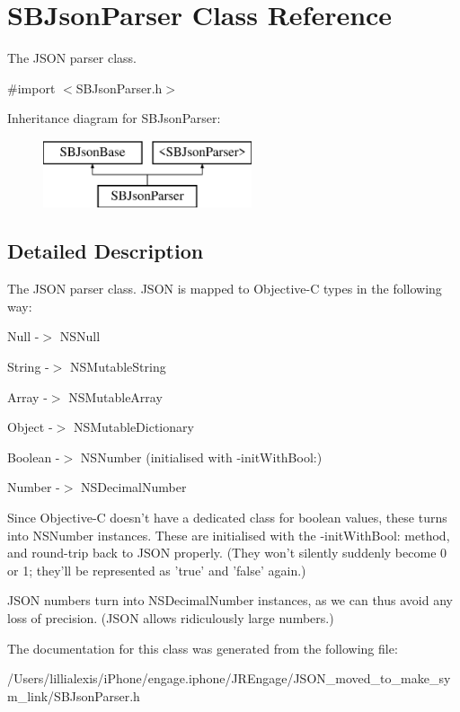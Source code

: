 \hypertarget{interface_s_b_json_parser}{
\section{SBJsonParser Class Reference}
\label{interface_s_b_json_parser}
}


The JSON parser class.  




{\ttfamily \#import $<$SBJsonParser.h$>$}

Inheritance diagram for SBJsonParser:\begin{figure}[H]
\begin{center}
\leavevmode
\includegraphics[height=2.000000cm]{interface_s_b_json_parser}
\end{center}
\end{figure}


\subsection{Detailed Description}
The JSON parser class. JSON is mapped to Objective-\/C types in the following way:

\begin{DoxyItemize}
\item Null -\/$>$ NSNull \item String -\/$>$ NSMutableString \item Array -\/$>$ NSMutableArray \item Object -\/$>$ NSMutableDictionary \item Boolean -\/$>$ NSNumber (initialised with -\/initWithBool:) \item Number -\/$>$ NSDecimalNumber\end{DoxyItemize}
Since Objective-\/C doesn't have a dedicated class for boolean values, these turns into NSNumber instances. These are initialised with the -\/initWithBool: method, and round-\/trip back to JSON properly. (They won't silently suddenly become 0 or 1; they'll be represented as 'true' and 'false' again.)

JSON numbers turn into NSDecimalNumber instances, as we can thus avoid any loss of precision. (JSON allows ridiculously large numbers.) 

The documentation for this class was generated from the following file:\begin{DoxyCompactItemize}
\item 
/Users/lillialexis/iPhone/engage.iphone/JREngage/JSON\_\-moved\_\-to\_\-make\_\-sym\_\-link/SBJsonParser.h\end{DoxyCompactItemize}
